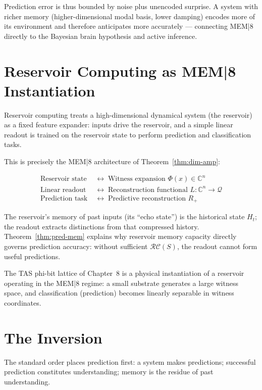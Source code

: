 \documentclass[12pt, oneside]{book}
\theoremstyle{plain}
\theoremstyle{definition}
\theoremstyle{remark}
\newcommand{\calQ}{\mathcal{Q}}
\newcommand{\CC}{\mathbb{C}}
\begin{document}
Prediction error is thus bounded by noise plus
unencoded surprise.
A system with richer memory (higher-dimensional modal
basis, lower damping) encodes more of its environment
and therefore anticipates more accurately --- connecting
MEM|8 directly to the Bayesian brain hypothesis and
active inference.

\section{Reservoir Computing as MEM|8 Instantiation}

Reservoir computing \cite{Friston2023} treats a
high-dimensional dynamical system (the reservoir) as a
fixed feature expander: inputs drive the reservoir,
and a simple linear readout is trained on the reservoir
state to perform prediction and classification tasks.

This is precisely the MEM|8 architecture of
Theorem~\ref{thm:dim-amp}:

\begin{align*}
  \text{Reservoir state} &\;\longleftrightarrow\; \text{Witness expansion } \Phi(x) \in \CC^n \\
  \text{Linear readout}  &\;\longleftrightarrow\; \text{Reconstruction functional } L : \CC^n \to \calQ \\
  \text{Prediction task} &\;\longleftrightarrow\; \text{Predictive reconstruction } R_+
\end{align*}

The reservoir's memory of past inputs (its ``echo state'')
is the historical state $H_t$; the readout extracts
distinctions from that compressed history.
Theorem~\ref{thm:pred-mem} explains why reservoir memory
capacity directly governs prediction accuracy: without
sufficient $\mathcal{RC}(S)$, the readout cannot form
useful predictions.

The TAS phi-bit lattice of Chapter~8 is a physical
instantiation of a reservoir operating in the MEM|8 regime:
a small substrate generates a large witness space, and
classification (prediction) becomes linearly separable
in witness coordinates.

\section{The Inversion}

The standard order places prediction first:
a system makes predictions; successful prediction
constitutes understanding; memory is the residue of
past understanding.
\end{document}
